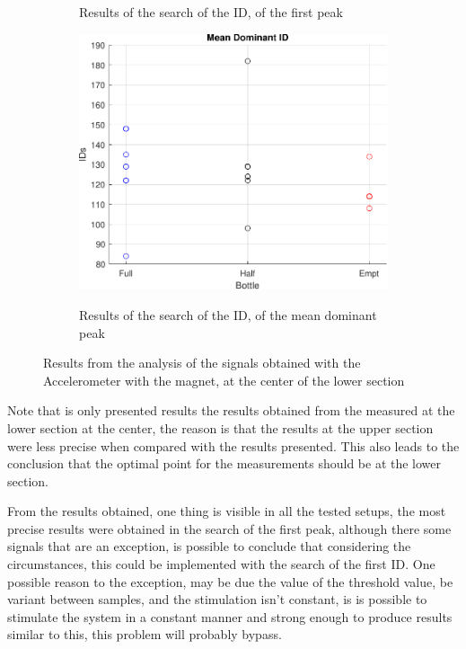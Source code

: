 \begin{figure}[]
\begin{subfigure}{0.45\textwidth}
        \caption{Results of the search of the ID, of the first peak}{}
        \label{subfig:fIDACCI}
    \end{subfigure}
    \begin{subfigure}{0.45\textwidth}
        \centering
        \includegraphics[width=\linewidth]{Chapters/6CHP/Figures/ResultsuCGraphs/Sen/BotMidAcImMa18_05mID.pdf}
        \caption{Results of the search of the ID, of the mean dominant peak}{}
        \label{subfig:mIDACCI}
    \end{subfigure}
    \caption{Results from the analysis of the signals obtained with the Accelerometer with the magnet, at the center of the lower section}{}
    \label{fig:ACCIResAlg}
\end{figure}
Note that is only presented results the results obtained from the measured at the lower section at the center, the reason is that the results at the upper section were less precise when compared with the results presented. This also leads to the conclusion that the optimal point for the measurements should be at the lower section. 

From the results obtained, one thing is visible in all the tested setups, the most precise results were obtained in the search of the first peak, although there some signals that are an exception, is possible to conclude that considering the circumstances, this could be implemented with the search of the first ID. One possible reason to the exception, may be due the value of the threshold value, be variant between samples, and the stimulation isn't constant, is is possible to stimulate the system in a constant manner and strong enough to produce results similar to this, this problem will probably bypass. 

